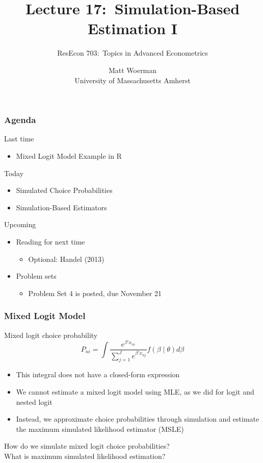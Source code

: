 \documentclass{beamer}
\title[Lecture 17:\ Simulation-Based Estimation I]{Lecture 17:\ Simulation-Based Estimation I}
\author[ResEcon 703:\ Advanced Econometrics]{ResEcon 703:\ Topics in Advanced Econometrics}
\date{Matt Woerman\\University of Massachusetts Amherst}
\begin{document}
{ 
\begin{frame}[noframenumbering]
    \titlepage
\end{frame}
}

\begin{frame}\frametitle{Agenda}
    Last time
    \begin{itemize}
        \item Mixed Logit Model Example in R
    \end{itemize}
    \vspace{2ex}
    Today
    \begin{itemize}
    	\item Simulated Choice Probabilities
        \item Simulation-Based Estimators
    \end{itemize}
    \vspace{2ex}
    Upcoming
    \begin{itemize}
        \item Reading for next time
        \begin{itemize}
            \item Optional: Handel (2013)
        \end{itemize}
        \item Problem sets
        \begin{itemize}
            \item Problem Set 4 is posted, due November 21
        \end{itemize}
    \end{itemize}
\end{frame}

\begin{frame}\frametitle{Mixed Logit Model}
    Mixed logit choice probability
    $$P_{ni} = \int \frac{e^{\beta' x_{ni}}}{\sum_{j = 1}^J e^{\beta' x_{nj}}} f(\beta \mid \theta) d \beta$$
    \begin{itemize}
        \item This integral does not have a closed-form expression
        \item We cannot estimate a mixed logit model using MLE, as we did for logit and nested logit
        \item Instead, we approximate choice probabilities through simulation and estimate the maximum simulated likelihood estimator (MSLE)
    \end{itemize}
    \vspace{2ex}
    How do we simulate mixed logit choice probabilities? \\
    \vspace{2ex}
    What is maximum simulated likelihood estimation?
\end{frame}
\end{document}
